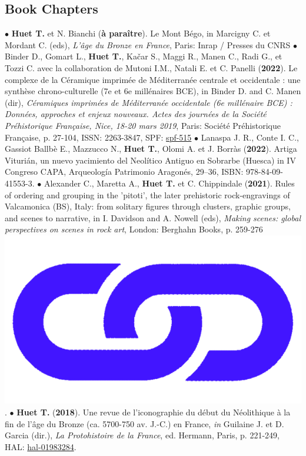 \documentclass{article}
\newcommand{\fr}[1]{} %
\newcommand{\en}[1]{#1}   %
\begin{document}
\bigbreak

\subsection*{\fr{Ouvrages (chapitres d')}\en{Book Chapters}}

$\bullet$ \textbf{Huet T.} et N. Bianchi (\textbf{à paraître}). Le Mont Bégo, in Marcigny C. et Mordant C. (eds), \textit{L'âge du Bronze en France}, Paris: Inrap / Presses du CNRS
\smallbreak
$\bullet$ Binder D., Gomart L., \textbf{Huet T.}, Ka{\v{c}}ar S., Maggi R., Manen C., Radi G., et Tozzi C. avec la collaboration de Mutoni I.M., Natali E. et C. Panelli (\textbf{2022}). Le complexe de la C\'{e}ramique imprim\'{e}e de M\'{e}diterran\'{e}e centrale et occidentale : une synthèse chrono-culturelle (7e et 6e millénaires BCE), in Binder D. and C. Manen (dir), \textit{C\'{e}ramiques imprim\'{e}es de M\'{e}diterran\'{e}e occidentale (6e mill\'{e}naire BCE) : Donn\'{e}es, approches et enjeux nouveaux. Actes des journ\'{e}es de la Soci\'{e}t\'{e} Pr\'{e}historique Fran\c{c}aise, Nice, 18-20 mars 2019}, Paris: Soci\'{e}t\'{e} Pr\'{e}historique Fran\c{c}aise, p. 27-104, ISSN: 2263-3847, SPF: \href{https://www.prehistoire.org/515_p_57657/accEs-libre-seance-18-ceramiques-imprimees-de-mediterranee-occidentale.html}{spf-515}
\smallbreak
$\bullet$ Lanaspa J. R., Conte I. C., Gassiot Ballbè E., Mazzucco N., \textbf{Huet T.}, Olomi A. et J. Borràs (\textbf{2022}). Artiga Viturián, un nuevo yacimiento del Neolítico Antiguo en Sobrarbe (Huesca) in IV Congreso CAPA, Arqueología Patrimonio Aragonés, 29–36, ISBN: 978-84-09-41553-3.
\smallbreak
$\bullet$ Alexander C., Maretta A., \textbf{Huet T.} et C. Chippindale (\textbf{2021}). Rules of ordering and grouping in the 'pitoti', the later prehistoric rock-engravings of Valcamonica (BS), Italy: from solitary figures through clusters, graphic groups, and scenes to narrative, in I. Davidson and A. Nowell (eds), \textit{Making scenes: global perspectives on scenes in rock art}, London: Berghahn Books, p. 259-276 \href{https://www.berghahnbooks.com/title/DavidsonMaking}{\includegraphics[scale=0.02]{link_darkblue.png}}.
\smallbreak
$\bullet$ \textbf{Huet T.} (\textbf{2018}). Une revue de l'iconographie du d\'{e}but du N\'{e}olithique \`{a} la fin de l'\^{a}ge du Bronze (ca. 5700-750 av. J.-C.) en France, \textit{in} Guilaine J. et D. Garcia (dir.), \textit{La Protohistoire de la France}, ed. Hermann, Paris, p. 221-249, HAL: \href{https://hal.archives-ouvertes.fr/hal-01983284}{hal-01983284}.
\bigbreak
\end{document}
